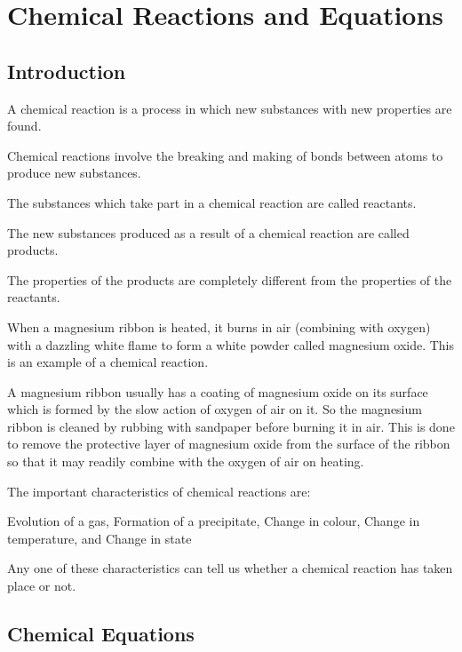 \chapter{Chemical Reactions and Equations}

\section{Introduction}

\begin{outline}

    \1 A chemical reaction is a process in which new substances with new properties are found.

    \1 Chemical reactions involve the breaking and making of bonds between atoms to produce new substances.

    \1 The substances which take part in a chemical reaction are called reactants.

    \1 The new substances produced as a result of a chemical reaction are called products.

    \1 The properties of the products are completely different from the properties of the reactants.

    \1 When a magnesium ribbon is heated, it burns in air (combining with oxygen) with a dazzling white flame to form a white powder called magnesium oxide. This is an example of a chemical reaction.

    \1 A magnesium ribbon usually has a coating of magnesium oxide on its surface which is formed by the slow action of oxygen of air on it. So the magnesium ribbon is cleaned by rubbing with sandpaper before burning it in air. This is done to remove the protective layer of magnesium oxide from the surface of the ribbon so that it may readily combine with the oxygen of air on heating.

    \1 The important characteristics of chemical reactions are:

    \2 Evolution of a gas,
    \2 Formation of a precipitate,
    \2 Change in colour,
    \2 Change in temperature, and
    \2 Change in state

    Any one of these characteristics can tell us whether a chemical reaction has taken place or not.

\end{outline}

\section{Chemical Equations}

